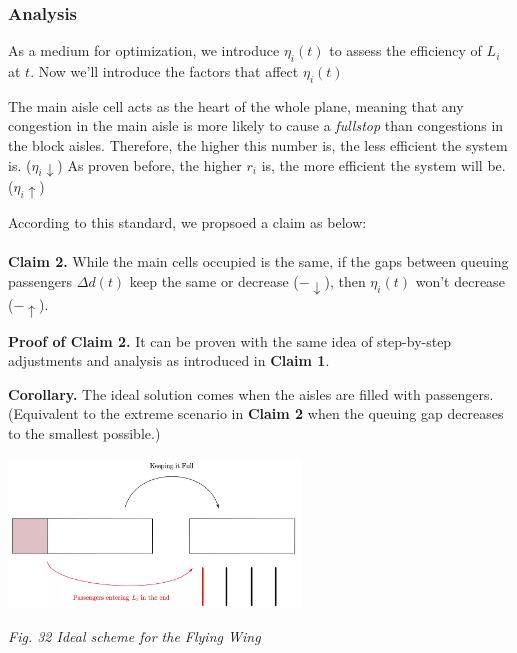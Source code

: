 \documentclass{article}
\theoremstyle{definition}
\theoremstyle{remark}
\numberwithin{equation}{section}
\begin{document}
	\subsubsection{Analysis}
	As a medium for optimization, we introduce $\eta_i (t)$ to assess the efficiency of $L_i$ at $t$. Now we'll introduce the factors that affect \(\eta_i (t)\)
	\begin{itemize}
			The main aisle cell acts as the heart of the whole plane, meaning that any congestion in the main aisle is more likely to cause a \textit{fullstop} than congestions in the block aisles. Therefore, the higher this number is, the less efficient the system is. (\(\eta_i \downarrow\))
			As proven before, the higher \(r_i\) is, the more efficient the system will be. (\(\eta_i \uparrow\))
	\end{itemize}

	According to this standard, we propsoed a claim as below: \\ \\

	\textbf{Claim 2.} While the main cells occupied is the same, if the gaps between queuing passengers \(\Delta d(t)\) keep the same or decrease (\(-\downarrow\)), then \(\eta_i(t)\) won't decrease (\(-\uparrow\)).

	\textbf{Proof of Claim 2.} It can be proven with the same idea of step-by-step adjustments and analysis as introduced in \textbf{Claim 1}.

	\textbf{Corollary.} The ideal solution comes when the aisles are filled with passengers. (Equivalent to the extreme scenario in \textbf{Claim 2} when the queuing gap decreases to the smallest possible.)

	\begin{center}
		\includegraphics[height = 4cm]{fw scheme.jpg}

		\small\textit{Fig. 32 Ideal scheme for the Flying Wing}
	\end{center}
\end{document}
